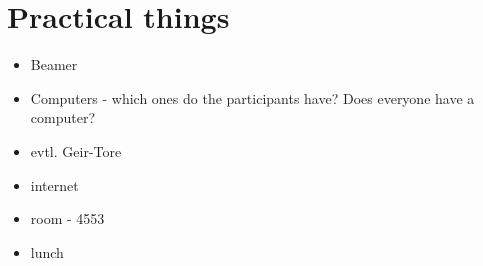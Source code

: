 \documentclass[a4paper,english,12pt]{article}
\begin{document}
\section{Practical things}

\begin{itemize}
\item Beamer
\item Computers - which ones do the participants have? Does everyone have a computer?
\item    evtl. Geir-Tore
\item internet
\item room - 4553
\item lunch
\end{itemize}
\end{document}
